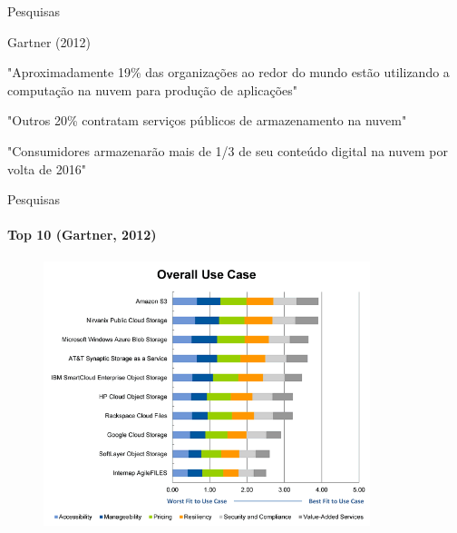 \begin{frame}{Pesquisas}

    \begin{block}{Gartner (2012)}
        \begin{itemise}
        \item<2-> "Aproximadamente 19\% das organizações ao redor do mundo estão utilizando
        a computação na nuvem para produção de aplicações"

        \item<3->
            "Outros 20\% contratam serviços públicos de armazenamento na nuvem"

        \item<4->
            "Consumidores armazenarão mais de 1/3 de seu conteúdo digital na nuvem
            por volta de 2016"
        \end{itemise}
    \end{block}


\end{frame}

\begin{frame}{Pesquisas}
    \framesubtitle{Top 10 (Gartner, 2012)}

    \begin{figure}
        \includegraphics[width=0.85\textwidth]{image/top10.png}
    \end{figure}

\end{frame}
